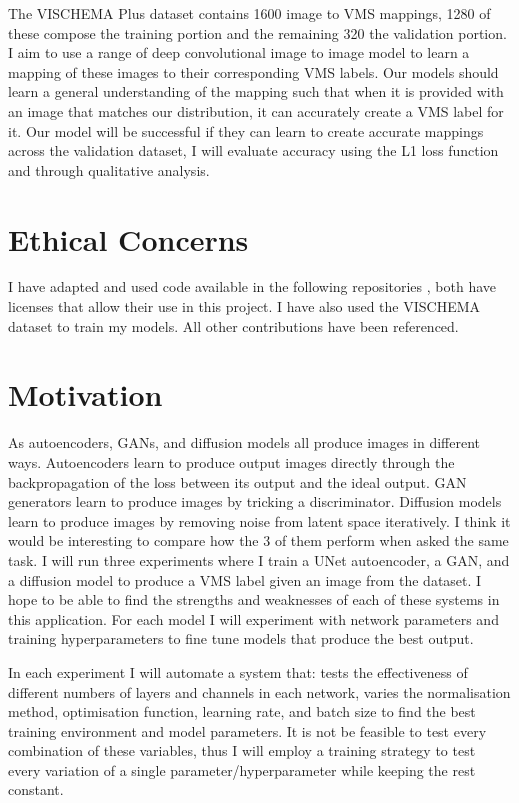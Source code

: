 \documentclass{UoYCSproject}
\begin{document}
The VISCHEMA Plus dataset contains 1600 image to VMS mappings, 1280 of these compose the training portion and the remaining 320 the validation portion. I aim to use a range of deep convolutional image to image model to learn a mapping of these images to their corresponding VMS labels. Our models should learn a general understanding of the mapping such that when it is provided with an image that matches our distribution, it can accurately create a VMS label for it. Our model will be successful if they can learn to create accurate mappings across the validation dataset, I will evaluate accuracy using the L1 loss function and through qualitative analysis. 

\section{Ethical Concerns}

I have adapted and used code available in the following repositories \cite{PytorchPix2Pix, JanspiryPalette}, both have licenses that allow their use in this project. I have also used the VISCHEMA dataset \cite{VischemaPaper} to train my models. All other contributions have been referenced. 

\section{Motivation}

As autoencoders, GANs, and diffusion models all produce images in different ways. Autoencoders learn to produce output images directly through the backpropagation of the loss between its output and the ideal output. GAN generators learn to produce images by tricking a discriminator. Diffusion models learn to produce images by removing noise from latent space iteratively. I think it would be interesting to compare how the 3 of them perform when asked the same task. I will run three experiments where I train a UNet autoencoder, a GAN, and a diffusion model to produce a VMS label given an image from the dataset. I hope to be able to find the strengths and weaknesses of each of these systems in this application. For each model I will experiment with network parameters and training hyperparameters to fine tune models that produce the best output.


In each experiment I will automate a system that: tests the effectiveness of different numbers of layers and channels in each network, varies the normalisation method, optimisation function, learning rate, and batch size to find the best training environment and model parameters. It is not be feasible to test every combination of these variables, thus I will employ a training strategy to test every variation of a single parameter/hyperparameter while keeping the rest constant.
\end{document}
